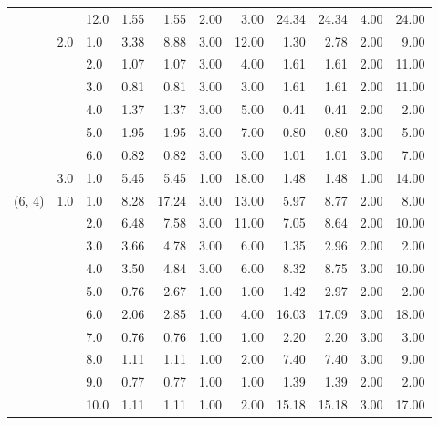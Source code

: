\begin{tabular}{lllrrrrrrrr}
       &     & 12.0 &       1.55 &      1.55 &  2.00 &   3.00 &      24.34 &     24.34 & 4.00 &  24.00 \\
       & 2.0 & 1.0  &       3.38 &      8.88 &  3.00 &  12.00 &       1.30 &      2.78 & 2.00 &   9.00 \\
       &     & 2.0  &       1.07 &      1.07 &  3.00 &   4.00 &       1.61 &      1.61 & 2.00 &  11.00 \\
       &     & 3.0  &       0.81 &      0.81 &  3.00 &   3.00 &       1.61 &      1.61 & 2.00 &  11.00 \\
       &     & 4.0  &       1.37 &      1.37 &  3.00 &   5.00 &       0.41 &      0.41 & 2.00 &   2.00 \\
       &     & 5.0  &       1.95 &      1.95 &  3.00 &   7.00 &       0.80 &      0.80 & 3.00 &   5.00 \\
       &     & 6.0  &       0.82 &      0.82 &  3.00 &   3.00 &       1.01 &      1.01 & 3.00 &   7.00 \\
       & 3.0 & 1.0  &       5.45 &      5.45 &  1.00 &  18.00 &       1.48 &      1.48 & 1.00 &  14.00 \\
(6, 4) & 1.0 & 1.0  &       8.28 &     17.24 &  3.00 &  13.00 &       5.97 &      8.77 & 2.00 &   8.00 \\
       &     & 2.0  &       6.48 &      7.58 &  3.00 &  11.00 &       7.05 &      8.64 & 2.00 &  10.00 \\
       &     & 3.0  &       3.66 &      4.78 &  3.00 &   6.00 &       1.35 &      2.96 & 2.00 &   2.00 \\
       &     & 4.0  &       3.50 &      4.84 &  3.00 &   6.00 &       8.32 &      8.75 & 3.00 &  10.00 \\
       &     & 5.0  &       0.76 &      2.67 &  1.00 &   1.00 &       1.42 &      2.97 & 2.00 &   2.00 \\
       &     & 6.0  &       2.06 &      2.85 &  1.00 &   4.00 &      16.03 &     17.09 & 3.00 &  18.00 \\
       &     & 7.0  &       0.76 &      0.76 &  1.00 &   1.00 &       2.20 &      2.20 & 3.00 &   3.00 \\
       &     & 8.0  &       1.11 &      1.11 &  1.00 &   2.00 &       7.40 &      7.40 & 3.00 &   9.00 \\
       &     & 9.0  &       0.77 &      0.77 &  1.00 &   1.00 &       1.39 &      1.39 & 2.00 &   2.00 \\
       &     & 10.0 &       1.11 &      1.11 &  1.00 &   2.00 &      15.18 &     15.18 & 3.00 &  17.00 \\

\end{tabular}

